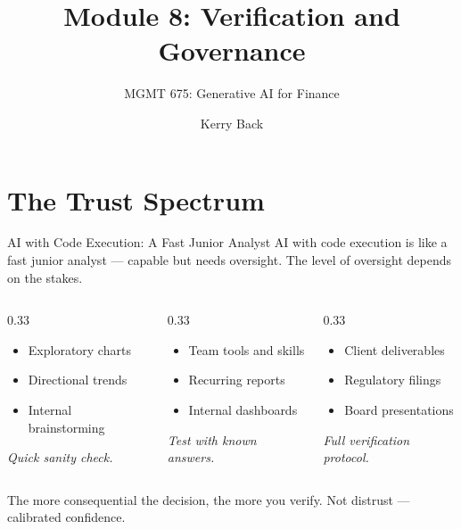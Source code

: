 \documentclass[aspectratio=169]{beamer}
\subtitle{MGMT 675: Generative AI for Finance}
\title{Module 8: Verification and Governance}
\author{Kerry Back}
\date{}
\begin{document}
\maketitle

\section{The Trust Spectrum}

\begin{frame}[shrink=5]{AI with Code Execution: A Fast Junior Analyst}
AI with code execution is like a \alert{fast junior analyst} --- capable but needs oversight. The level of oversight depends on the stakes.
\vspace{0.3cm}
\begin{columns}[T]
\begin{column}{0.33\textwidth}
\begin{shadedbox}[title=\textbf{Low-Stakes}]
\begin{itemize}\small
  \item Exploratory charts
  \item Directional trends
  \item Internal brainstorming
\end{itemize}
\vspace{0.2cm}
\centering\small\textit{Quick sanity check.}
\end{shadedbox}
\end{column}
\begin{column}{0.33\textwidth}
\begin{shadedbox}[title=\textbf{Medium-Stakes}]
\begin{itemize}\small
  \item Team tools and skills
  \item Recurring reports
  \item Internal dashboards
\end{itemize}
\vspace{0.2cm}
\centering\small\textit{Test with known answers.}
\end{shadedbox}
\end{column}
\begin{column}{0.33\textwidth}
\begin{shadedbox}[title=\textbf{High-Stakes}]
\begin{itemize}\small
  \item Client deliverables
  \item Regulatory filings
  \item Board presentations
\end{itemize}
\vspace{0.2cm}
\centering\small\textit{Full verification protocol.}
\end{shadedbox}
\end{column}
\end{columns}
\vspace{0.3cm}
The more consequential the decision, the more you verify. \alert{Not distrust --- calibrated confidence.}
\end{frame}
\end{document}
